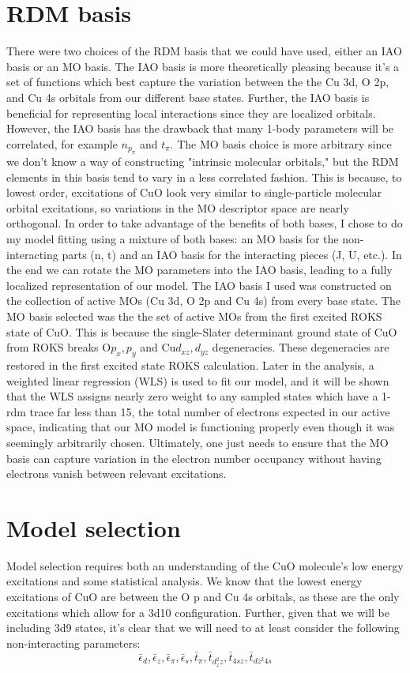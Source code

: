 \documentclass{article}
\begin{document}
\section{RDM basis}
There were two choices of the RDM basis that we could have used, either an IAO basis or an MO basis. The IAO basis is more theoretically pleasing because it's a set of functions which best capture the variation between the the Cu 3d, O 2p, and Cu 4s orbitals from our different base states. Further, the IAO basis is beneficial for representing local interactions since they are localized orbitals. However, the IAO basis has the drawback that many 1-body parameters will be correlated, for example $n_{p_\pi}$ and $t_\pi$. The MO basis choice is more arbitrary since we don't know a way of constructing "intrinsic molecular orbitals," but the RDM elements in this basis tend to vary in a less correlated fashion. This is because, to lowest order, excitations of CuO look very similar to single-particle molecular orbital excitations, so variations in the MO descriptor space are nearly orthogonal. In order to take advantage of the benefits of both bases, I chose to do my model fitting using a mixture of both bases: an MO basis for the non-interacting parts (n, t) and an IAO basis for the interacting pieces (J, U, etc.). In the end we can rotate the MO parameters into the IAO basis, leading to a fully localized representation of our model. The IAO basis I used was constructed on the collection of active MOs (Cu 3d, O 2p and Cu 4s) from every base state. The MO basis selected was the the set of active MOs from the first excited ROKS state of CuO. This is because the single-Slater determinant ground state of CuO from ROKS breaks O$p_x, p_y$ and Cu$d_{xz}, d_{yz}$ degeneracies. These degeneracies are restored in the first excited state ROKS calculation. Later in the analysis, a weighted linear regression (WLS) is used to fit our model, and it will be shown that the WLS assigns nearly zero weight to any sampled states which have a 1-rdm trace far less than 15, the total number of electrons expected in our active space, indicating that our MO model is functioning properly even though it was seemingly arbitrarily chosen. Ultimately, one just needs to ensure that the MO basis can capture variation in the electron number occupancy without having electrons vanish between relevant excitations.

\section{Model selection}
Model selection requires both an understanding of the CuO molecule's low energy excitations and some statistical analysis. We know that the lowest energy excitations of CuO are between the O p and Cu 4s orbitals, as these are the only excitations which allow for a 3d10 configuration. Further, given that we will be including 3d9 states, it's clear that we will need to at least consider the following non-interacting parameters:
$$\bar{\epsilon}_d, \bar{\epsilon}_z, \bar{\epsilon}_\pi, \bar{\epsilon}_s, \bar{t}_\pi, \bar{t}_{d_z^2 z}, \bar{t}_{4s z}, \bar{t}_{dz^2 4s}$$
\end{document}
